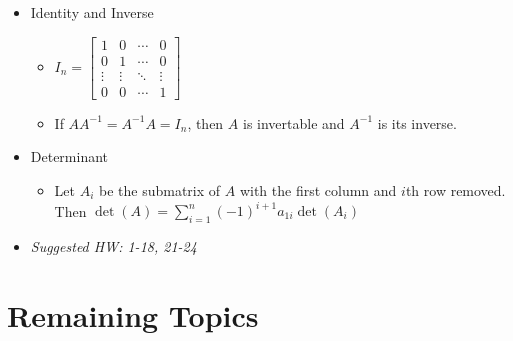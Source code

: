 \documentclass[11pt]{article}
\theoremstyle{plain}
\theoremstyle{definition}
\theoremstyle{remark}
\newcommand{\<}{\langle}
\renewcommand{\>}{\rangle}
\begin{document}
\begin{itemize}
\begin{itemize}
    \end{itemize}
  \item Identity and Inverse
    \begin{itemize}
      \item
        \(
          I_n =
          \begin{bmatrix}
            1      & 0      & \cdots & 0      \\
            0      & 1      & \cdots & 0      \\
            \vdots & \vdots & \ddots & \vdots \\
            0      & 0      & \cdots & 1
          \end{bmatrix}
        \)
      \item
        If \(AA^{-1}=A^{-1}A=I_n\), then \(A\) is invertable and
        \(A^{-1}\) is its inverse.
    \end{itemize}
  \item Determinant
    \begin{itemize}
      \item Let \(A_i\) be the submatrix of \(A\) with the first column
      and \(i\)th row removed. Then
        \(
          \det(A)
            =
          \sum_{i=1}^n
          (-1)^{i+1}
          a_{1i}\det(A_i)
        \)
    \end{itemize}
  \item\textit{
    Suggested HW: 1-18, 21-24
  }
\end{itemize}


\section*{Remaining Topics}
\end{document}

